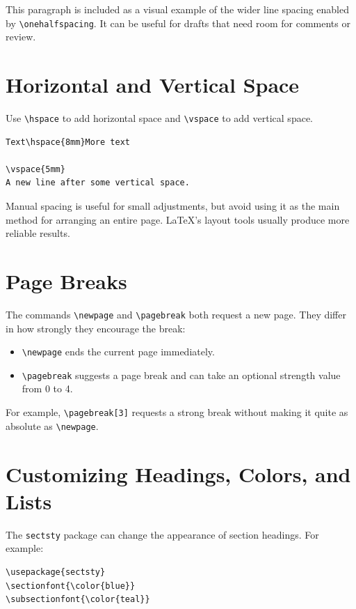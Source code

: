 \documentclass[12pt,a4paper]{article}
\begin{document}
\onehalfspacing

This paragraph is included as a visual example of the wider line spacing
enabled by \verb|\onehalfspacing|. It can be useful for drafts that need room
for comments or review.

\singlespacing

\section{Horizontal and Vertical Space}

Use \verb|\hspace| to add horizontal space and \verb|\vspace| to add vertical
space.

\begin{verbatim}
Text\hspace{8mm}More text

\vspace{5mm}
A new line after some vertical space.
\end{verbatim}

Manual spacing is useful for small adjustments, but avoid using it as the main
method for arranging an entire page. LaTeX's layout tools usually produce more
reliable results.

\section{Page Breaks}

The commands \verb|\newpage| and \verb|\pagebreak| both request a new page.
They differ in how strongly they encourage the break:

\begin{itemize}
    \item \verb|\newpage| ends the current page immediately.
    \item \verb|\pagebreak| suggests a page break and can take an optional
    strength value from 0 to 4.
\end{itemize}

For example, \verb|\pagebreak[3]| requests a strong break without making it
quite as absolute as \verb|\newpage|.

\section{Customizing Headings, Colors, and Lists}

The \texttt{sectsty} package can change the appearance of section headings.
For example:

\begin{verbatim}
\usepackage{sectsty}
\sectionfont{\color{blue}}
\subsectionfont{\color{teal}}
\end{verbatim}
\end{document}
